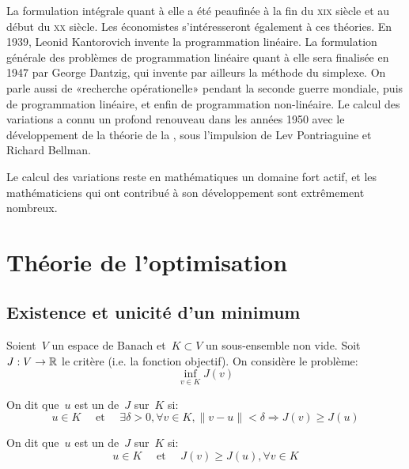 \begin{histoire}
\medskip
La formulation intégrale quant à elle a été peaufinée à la fin du \textsc{xix} siècle et au début du \textsc{xx} siècle.
Les économistes s'intéresseront également à ces théories.
En 1939, Leonid Kantorovich invente la programmation linéaire. La formulation générale des problèmes de programmation linéaire quant à elle sera finalisée en 1947 par George Dantzig, qui invente par ailleurs la méthode du simplexe. On parle aussi de «recherche opérationelle» pendant la seconde guerre mondiale, puis de programmation linéaire, et enfin de programmation non-linéaire.
Le calcul des variations a connu un profond renouveau dans les années 1950 avec le développement de la théorie de la , sous l'impulsion de Lev Pontriaguine et Richard Bellman. 

Le calcul des variations reste en mathématiques un domaine fort actif, et les mathématiciens qui ont contribué à son développement sont extrêmement nombreux.
\end{histoire}

\ifVersionDuDocEstVincent\newpage\else\medskip\fi
\section{Théorie de l'optimisation}

\subsection{Existence et unicité d'un minimum}
\begin{definition}[Minima]
Soient~$V$ un espace de Banach et~$K\subset V$ un sous-ensemble non vide. Soit~$J: V\rightarrow\mathbb R$ le critère (i.e. la fonction objectif). On considère le problème:
\begin{equation}
\inf_{v\in K} J(v)
\end{equation}

On dit que~$u$ est un  de~$J$ sur~$K$ si:
\begin{equation}
u\in K \quad\text{ et }\quad \exists\delta>0, \forall v\in K, 
\|v-u\|<\delta \Rightarrow J(v)\ge J(u)
\end{equation}

On dit que~$u$ est un  de~$J$ sur~$K$ si:
\begin{equation}
u\in K \quad\text{ et }\quad J(v)\ge J(u), \forall v\in K
\end{equation}
\end{definition}

